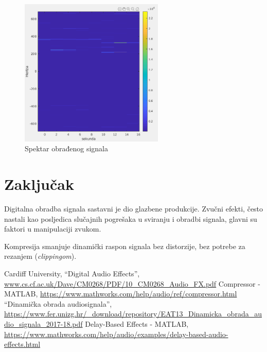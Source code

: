 \documentclass[conference]{IEEEtran}
\begin{document}
\begin{figure}[H]
  \centerline{\includegraphics[height=200pt]{slike/echo.png}}
  \caption{Spektar obrađenog signala}
  \label{echo}
\end{figure}


\section{Zaključak}
Digitalna obradba signala sastavni je dio glazbene produkcije. Zvučni efekti, često nastali kao
posljedica slučajnih pogrešaka u sviranju i obradbi signala, glavni su faktori u manipulaciji zvukom.

Kompresija smanjuje dinamički raspon signala bez distorzije, bez potrebe za rezanjem
(\textit{clippingom}).

\begin{thebibliography}{00}
 Cardiff University, ``Digital Audio Effects'',
	\url{www.cs.cf.ac.uk/Dave/CM0268/PDF/10_CM0268_Audio_FX.pdf}
   Compressor - MATLAB,
  \url{https://www.mathworks.com/help/audio/ref/compressor.html}
   ``Dinamička obrada audiosignala'',
  \url{https://www.fer.unizg.hr/_download/repository/EAT13_Dinamicka_obrada_audio_signala_2017-18.pdf}
   Delay-Based Effects - MATLAB,
  \url{https://www.mathworks.com/help/audio/examples/delay-based-audio-effects.html}
\end{thebibliography}
\end{document}
